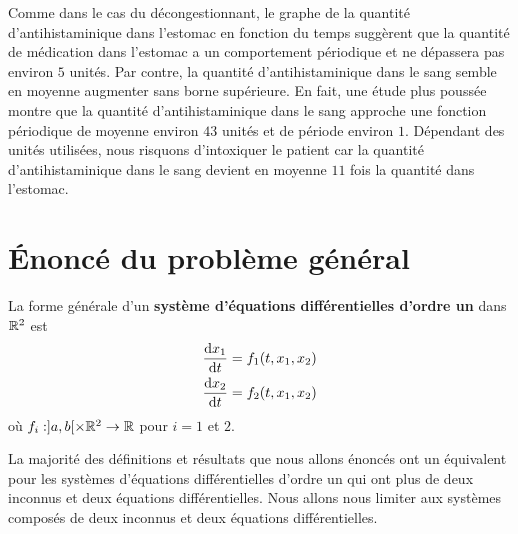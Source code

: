 {\begin{egg}
Comme dans le cas du décongestionnant, le graphe de la quantité
d'antihistaminique dans l'estomac en fonction du temps suggèrent que la
quantité de médication dans l'estomac a un comportement périodique et ne
dépassera pas environ $5$ unités.  Par contre, la quantité
d'antihistaminique dans le sang semble en moyenne augmenter sans borne
supérieure.  En fait, une étude plus poussée montre que la quantité
d'antihistaminique dans le sang approche une fonction périodique de moyenne
environ $43$ unités et de période environ $1$.  Dépendant des unités
utilisées, nous risquons d'intoxiquer le patient car la quantité
d'antihistaminique dans le sang devient en moyenne $11$ fois la
quantité dans l'estomac.
\end{egg}

\section{Énoncé du problème général}

La forme générale d'un {\bfseries système d'équations différentielles
d'ordre un} dans
$\mathbb{R}^2$ est
\begin{equation} \label{sediff1}
\begin{split}
\frac{\mathrm{d}x_1}{\mathrm{d}t} &= f_1(t,x_1,x_2) \\
\frac{\mathrm{d}x_2}{\mathrm{d}t} &= f_2(t,x_1,x_2)
\end{split}
\end{equation}
où $f_i:]a,b[\times \mathbb{R}^2 \rightarrow \mathbb{R}$ pour $i=1$ et $2$.

La majorité des définitions et résultats que nous allons énoncés ont un
équivalent pour les systèmes d'équations différentielles d'ordre un
qui ont plus de deux inconnus et deux équations différentielles.  Nous
allons nous limiter aux systèmes composés de deux inconnus et deux
équations différentielles.

}
